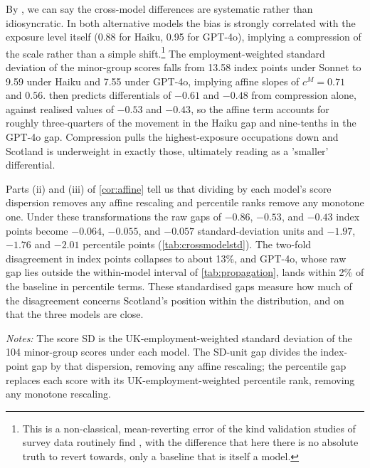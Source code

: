 By , we can say the cross-model differences are systematic rather than idiosyncratic. In both alternative models the bias is strongly correlated with the exposure level itself (0.88 for Haiku, 0.95 for GPT-4o), implying a compression of the scale rather than a simple shift.\footnote{This is a non-classical, mean-reverting error of the kind validation studies of survey data routinely find \citep{bound1991}, with the difference that here there is no absolute truth to revert towards, only a baseline that is itself a model.} The employment-weighted standard deviation of the minor-group scores falls from 13.58 index points under Sonnet to 9.59 under Haiku and 7.55 under GPT-4o, implying affine slopes of $c^{M} = 0.71$ and $0.56$.  then predicts differentials of $-0.61$ and $-0.48$ from compression alone, against realised values of $-0.53$ and $-0.43$, so the affine term accounts for roughly three-quarters of the movement in the Haiku gap and nine-tenths in the GPT-4o gap. Compression pulls the highest-exposure occupations down and Scotland is underweight in exactly those, ultimately reading as a 'smaller' differential.
 
Parts (ii) and (iii) of \cref{cor:affine} tell us that dividing by each model's score dispersion removes any affine rescaling and percentile ranks remove any monotone one. Under these transformations the raw gaps of $-0.86$, $-0.53$, and $-0.43$ index points become $-0.064$, $-0.055$, and $-0.057$ standard-deviation units and $-1.97$, $-1.76$ and $-2.01$ percentile points (\cref{tab:crossmodelstd}). The two-fold disagreement in index points collapses to about 13\%, and GPT-4o, whose raw gap lies outside the within-model interval of \cref{tab:propagation}, lands within 2\% of the baseline in percentile terms. These standardised gaps measure how much of the disagreement concerns Scotland's position within the distribution, and on that the three models are close.
 
\begin{table}[t]
\centering
\caption{Scale-free cross-model differentials}
\label{tab:crossmodelstd}
\small

\begin{minipage}{0.92\textwidth}
\vspace{0.4em}\footnotesize
\textit{Notes:} The score SD is the UK-employment-weighted standard deviation of the 104 minor-group scores under each model. The SD-unit gap divides the index-point gap by that dispersion, removing any affine rescaling; the percentile gap replaces each score with its UK-employment-weighted percentile rank, removing any monotone rescaling. 
\end{minipage}
\end{table}
 
